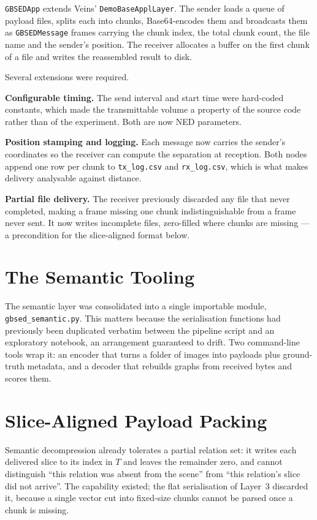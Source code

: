 \documentclass{iutbscthesis}
\begin{document}
\texttt{GBSEDApp} extends Veins' \texttt{DemoBaseApplLayer}. The sender loads a
queue of payload files, splits each into chunks, Base64-encodes them and
broadcasts them as \texttt{GBSEDMessage} frames carrying the chunk index, the
total chunk count, the file name and the sender's position. The receiver
allocates a buffer on the first chunk of a file and writes the reassembled
result to disk.

Several extensions were required.

\textbf{Configurable timing.} The send interval and start time were hard-coded
constants, which made the transmittable volume a property of the source code
rather than of the experiment. Both are now NED parameters.

\textbf{Position stamping and logging.} Each message now carries the sender's
coordinates so the receiver can compute the separation at reception. Both nodes
append one row per chunk to \texttt{tx\_log.csv} and \texttt{rx\_log.csv},
which is what makes delivery analysable against distance.

\textbf{Partial file delivery.} The receiver previously discarded any file that
never completed, making a frame missing one chunk indistinguishable from a
frame never sent. It now writes incomplete files, zero-filled where chunks are
missing --- a precondition for the slice-aligned format below.

\section{The Semantic Tooling}

The semantic layer was consolidated into a single importable module,
\texttt{gbsed\_semantic.py}. This matters because the serialisation functions
had previously been duplicated verbatim between the pipeline script and an
exploratory notebook, an arrangement guaranteed to drift. Two command-line
tools wrap it: an encoder that turns a folder of images into payloads plus
ground-truth metadata, and a decoder that rebuilds graphs from received bytes
and scores them.

\section{Slice-Aligned Payload Packing}

Semantic decompression already tolerates a partial relation set: it writes each
delivered slice to its index in $T$ and leaves the remainder zero, and cannot
distinguish ``this relation was absent from the scene'' from ``this relation's
slice did not arrive''. The capability existed; the flat serialisation of
Layer~3 discarded it, because a single vector cut into fixed-size chunks cannot
be parsed once a chunk is missing.
\end{document}
